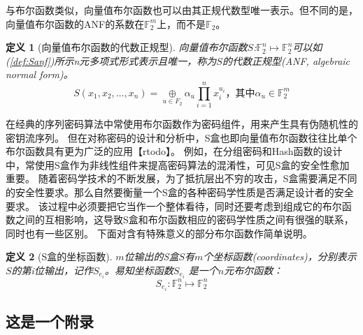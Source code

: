 \documentclass{xduugthesis}
\numberwithin{equation}{section}
\newtheorem{definition}{定义}
\begin{document}
与布尔函数类似，向量值布尔函数也可以由其正规代数型唯一表示。但不同的是，向量值布尔函数的ANF的系数在$\mathbb{F}_2^m$上，而不是$\mathbb{F}_2$。
\begin{definition}[向量值布尔函数的代数正规型]
    向量值布尔函数$S$:$\mathbb{F}_2^n \mapsto \mathbb{F}_2^n$可以如(\ref{def:Sanf})所示n元多项式形式表示且唯一，称为$S$的代数正规型(ANF, algebraic normal form)。
    \begin{equation}
        S(x_1,x_2,\dots ,x_n) = \mathop{\oplus}\limits_{u \in F_2}\alpha_u \prod\limits_{i=1}^n x_i^{u_i}\mbox{，其中}\alpha_u \in \mathbb{F}_2^m \label{def:Sanf}
    \end{equation}
\end{definition}\par

在经典的序列密码算法中常使用布尔函数作为密码组件，用来产生具有伪随机性的密钥流序列。
但在对称密码的设计和分析中，S盒也即向量值布尔函数往往比单个布尔函数具有更为广泛的应用【rtodo】。
例如，在分组密码和Hash函数的设计中，常使用S盒作为非线性组件来提高密码算法的混淆性，可见S盒的安全性愈加重要。
随着密码学技术的不断发展，为了抵抗层出不穷的攻击，S盒需要满足不同的安全性要求。那么自然要衡量一个S盒的各种密码学性质是否满足设计者的安全要求。
该过程中必须要把它当作一个整体看待，同时还要考虑到组成它的布尔函数之间的互相影响，这导致S盒和布尔函数相应的密码学性质之间有很强的联系，同时也有一些区别。
下面对含有特殊意义的部分布尔函数作简单说明。\par

\begin{definition}[S盒的坐标函数]
    $m$位输出的S盒$S$有$m$个坐标函数(\emph{coordinates})，分别表示$S$的第i位输出，记作$S_{e_i}$。易知坐标函数$S_{e_i}$
    是一个$n$元布尔函数：
    $$
    S_{e_i}:\mathbb{F}_2^n \mapsto \mathbb{F}_2^n
    $$
\end{definition}\par

\backmatter
\begin{appendixes}
    \chapter{这是一个附录}
\end{appendixes}
\end{document}

